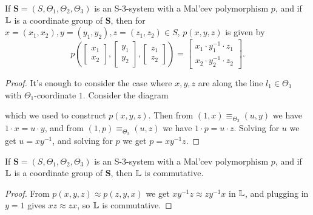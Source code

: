 \documentclass[letterpaper,11pt]{article}
\begin{document}
\begin{lem}\label{S3-malcev-loop} If $\mathbf{S} = (S,\Theta_1,\Theta_2,\Theta_3)$ is an S-3-system with a Mal'cev polymorphism $p$, and if $\mathbb{L}$ is a coordinate group of $\mathbf{S}$, then for $x = (x_1,x_2), y = (y_1,y_2), z = (z_1,z_2) \in S$, $p(x,y,z)$ is given by
\[
p\left(\begin{bmatrix} x_1\\ x_2\end{bmatrix}, \begin{bmatrix} y_1\\ y_2\end{bmatrix}, \begin{bmatrix} z_1\\ z_2\end{bmatrix}\right) = \begin{bmatrix} x_1\cdot y_1^{-1}\cdot z_1\\ x_2\cdot y_2^{-1}\cdot z_2\end{bmatrix}.
\]
\end{lem}
\begin{proof} It's enough to consider the case where $x,y,z$ are along the line $l_1 \in \Theta_1$ with $\Theta_1$-coordinate $1$. Consider the diagram
\begin{center}
\end{center}
which we used to construct $p(x,y,z)$. Then from $(1,x) \equiv_{\Theta_3} (u,y)$ we have $1\cdot x = u\cdot y$, and from $(1,p) \equiv_{\Theta_3} (u,z)$ we have $1 \cdot p = u \cdot z$. Solving for $u$ we get $u = xy^{-1}$, and solving for $p$ we get $p = xy^{-1}z$.
\end{proof}

\begin{cor} If $\mathbf{S} = (S,\Theta_1,\Theta_2,\Theta_3)$ is an S-3-system with a Mal'cev polymorphism $p$, and if $\mathbb{L}$ is a coordinate group of $\mathbf{S}$, then $\mathbb{L}$ is commutative.
\end{cor}
\begin{proof} From $p(x,y,z) \approx p(z,y,x)$ we get $xy^{-1}z \approx zy^{-1}x$ in $\mathbb{L}$, and plugging in $y = 1$ gives $xz \approx zx$, so $\mathbb{L}$ is commutative.
\end{proof}
\end{document}
